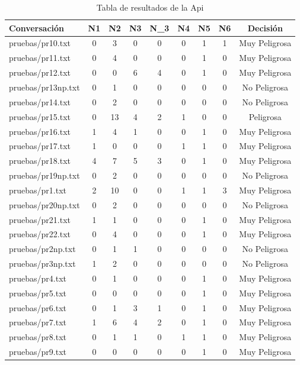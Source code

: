 \begin{table}
\begin{center}


\begin{tabular}{|l|c|c|c|c|c|c|c|c|}

\hline
Conversaci\'on & N1 & N2 & N3 & N\_3 & N4 & N5 & N6 & Decisi\'on \\
\hline
pruebas/pr10.txt &
 0 &
 3 &
 0 &
 0 &
 0 &
 1 &
 1 &
Muy Peligrosa \\
pruebas/pr11.txt &
 0 &
 4 &
 0 &
 0 &
 0 &
 1 &
 0 &
Muy Peligrosa \\ 
pruebas/pr12.txt &
 0 &
 0 &
 6 &
 4 &
 0 &
 1 &
 0 &
Muy Peligrosa \\ 
pruebas/pr13np.txt &
 0 &
 1 &
 0 &
  0 &
 0 &
 0 &
 0 &
No Peligrosa \\ 
pruebas/pr14.txt &
 0 &
 2 &
 0 &
 0 &
 0 &
 0 &
 0 &
No Peligrosa \\ 
pruebas/pr15.txt &
 0 &
 13 &
 4 &
 2 &
 1 &
 0 &
 0 &
Peligrosa \\
pruebas/pr16.txt &
 1 &
 4 &
 1 &
 0 &
 0 &
 1 &
 0 &
Muy Peligrosa \\ 
pruebas/pr17.txt &
 1 &
 0 &
 0 &
 0 &
 1 &
 1 &
 0 &
Muy Peligrosa \\ 
pruebas/pr18.txt &
 4 &
 7 &
 5 &
 3 &
 0 &
 1 &
 0 &
Muy Peligrosa \\ 
pruebas/pr19np.txt &
 0 &
 2 &
 0 &
 0 &
 0 &
 0 &
 0 &
No Peligrosa \\ 
pruebas/pr1.txt &
 2 &
 10 &
 0 &
 0 &
 1 &
 1 &
 3 &
Muy Peligrosa \\ 
pruebas/pr20np.txt &
 0 &
 2 &
 0 & 
 0 &
 0 &
 0 &
 0 &
No Peligrosa \\ 
pruebas/pr21.txt &
 1 &
 1 &
 0 &
 0 &
 0 &
 1 &
 0 &
Muy Peligrosa \\ 
pruebas/pr22.txt &
 0 &
 4 &
 0 &
 0 &
 0 & 
 1 &
 0 &
Muy Peligrosa \\ 
pruebas/pr2np.txt &
 0 &
 1 & 
 1 &
 0 &
 0 &
 0 &
 0 &
No Peligrosa \\
pruebas/pr3np.txt &
 1 &
 2 &
 0 &
 0 &
 0 &
 0 &
 0 &
No Peligrosa \\
pruebas/pr4.txt &
 0 &
 1 &
 0 &
 0 &
 0 &
 1 &
 0 &
Muy Peligrosa \\
pruebas/pr5.txt &
 0 &
 0 &
 0 &
 0 &
 0 &
 1 &
 0 &
Muy Peligrosa \\
pruebas/pr6.txt &
 0 &
 1 &
 3 &
 1 &
 0 &
 1 &
 0 &
Muy Peligrosa \\ 
pruebas/pr7.txt &
 1 &
 6 &
 4 &
 2 &
 0 &
 1 &
 0 &
Muy Peligrosa \\ 
pruebas/pr8.txt &
 0 &
 1 &
 1 &
 0 &
 1 &
 1 &
 0 &
Muy Peligrosa \\
pruebas/pr9.txt &
 0 &
 0 &
 0 &
 0 &
 0 &
 1 &
 0 &
Muy Peligrosa \\ 
\hline
\end{tabular}

\caption{Tabla de resultados de la Api}
\label{tab:resultadasapi}
\end{center}
\end{table}
